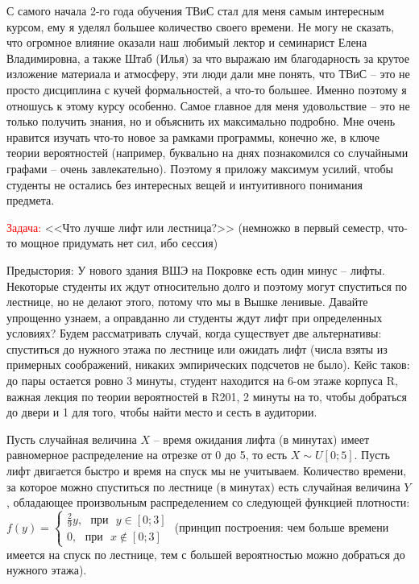 \documentclass[a4paper,11pt]{article}
\begin{document}
	\begin{tcolorbox}[enhanced jigsaw,breakable,pad at break*=1mm, attach boxed title to top center={yshift=-3mm,yshifttext=-1mm},
	colback=blue!5!white,colframe=blue!100!black,colbacktitle=blue!100!black,
	title=Почему именно меня должны взять в ассисенты?,fonttitle=\bfseries,
	boxed title style={size=small,colframe=black!100!black}]
	С самого начала 2-го года обучения ТВиС стал для меня самым интересным курсом, ему я уделял большее количество своего времени. Не могу не сказать, что огромное влияние оказали наш любимый лектор и семинарист Елена Владимировна, а также Штаб (Илья) за что выражаю им благодарность за крутое изложение материала и атмосферу, эти люди дали мне понять, что ТВиС -- это не просто дисциплина с кучей формальностей, а что-то большее. Именно поэтому я отношусь к этому курсу особенно. Самое главное для меня удовольствие -- это не только получить знания, но и объяснить их максимально подробно. Мне очень нравится изучать что-то новое за рамками программы, конечно же, в ключе теории вероятностей (например, буквально на днях познакомился со случайными графами -- очень завлекательно). Поэтому я приложу максимум усилий, чтобы студенты не остались без интересных вещей и интуитивного понимания предмета.
	\end{tcolorbox}

	\begin{center}
		{\large \textcolor{red}{Задача:} <<Что лучше лифт или лестница?>> (немножко в первый семестр, что-то мощное придумать нет сил, ибо сессия)}
	\end{center}

	Предыстория: У нового здания ВШЭ на Покровке есть один минус -- лифты. Некоторые студенты их ждут относительно долго и поэтому могут спуститься по лестнице, но не делают этого, потому что мы в Вышке ленивые. Давайте упрощенно узнаем, а оправданно ли студенты ждут лифт при определенных условиях? Будем рассматривать случай, когда существует две альтернативы: спуститься до нужного этажа по лестнице или ожидать лифт (числа взяты из примерных соображений, никаких эмпирических подсчетов не было). Кейс таков: до пары остается ровно 3 минуты, студент находится на 6-ом этаже корпуса R, важная лекция по теории вероятностей в R201, 2 минуты на то, чтобы добраться до двери и 1 для того, чтобы найти место и сесть в аудитории.
	
	Пусть случайная величина $ X $ -- время ожидания лифта (в минутах) имеет равномерное распределение на отрезке от 0 до 5, то есть $ X \sim U[0;5] $. Пусть лифт двигается быстро и время на спуск мы не учитываем. Количество времени, за которое можно спуститься по лестнице (в минутах) есть случайная величина $ Y $, обладающее произвольным распределением со следующей функцией плотности: $ f(y) = \begin{cases}
	\frac{2}{9}y, \text{ } \text{при} \text{ } y\in[0;3] \\
	0, \text{ } \text{при} \text{ } x\notin[0;3]
	\end{cases} $ (принцип построения: чем больше времени имеется на спуск по лестнице, тем с большей вероятностью можно добраться до нужного этажа).
	
\end{document}
